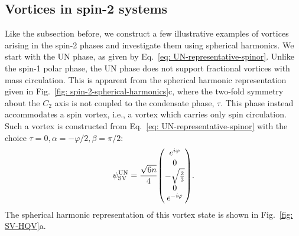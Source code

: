 \subsection{Vortices in spin-2 systems}\label{sec: vortices-spin-2}
Like the subsection before, we construct a few illustrative examples of vortices
arising in the spin-2 phases and investigate them using spherical harmonics.
We start with the UN phase, as given by
Eq.~\eqref{eq: UN-representative-spinor}.
Unlike the spin-1 polar phase, the UN phase does not support fractional vortices
with mass circulation.
This is apparent from the spherical harmonic representation given in
Fig.~\ref{fig: spin-2-spherical-harmonics}c, where the two-fold symmetry
about the \(C_2\) axis is not coupled to the condensate phase, \(\tau \).
This phase instead accommodates a spin vortex, i.e., a vortex which carries only
spin circulation.
Such a vortex is constructed from Eq.~\eqref{eq: UN-representative-spinor} with
the choice \(\tau=0, \alpha=-\varphi/2, \beta=\pi/2\):
\begin{equation}
    \psi^\text{UN}_\text{SV} = \frac{\sqrt{6n}}{4}\mqty(
    e^{i\varphi} \\
    0 \\
    -\sqrt{\frac{2}{3}} \\
    0 \\ e^{-i\varphi}
    ).
\end{equation}
The spherical harmonic representation of this vortex state is shown in
Fig.~\ref{fig: SV-HQV}a.
